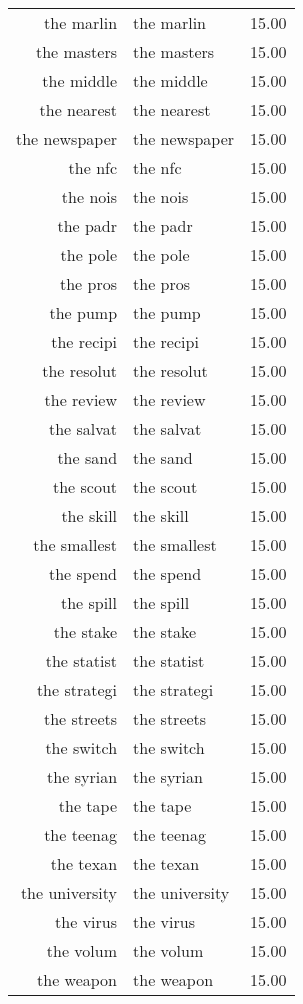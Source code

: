 \begin{table}[ht]
\begin{tabular}{rlr}
  the marlin & the marlin & 15.00 \\ 
  the masters & the masters & 15.00 \\ 
  the middle & the middle & 15.00 \\ 
  the nearest & the nearest & 15.00 \\ 
  the newspaper & the newspaper & 15.00 \\ 
  the nfc & the nfc & 15.00 \\ 
  the nois & the nois & 15.00 \\ 
  the padr & the padr & 15.00 \\ 
  the pole & the pole & 15.00 \\ 
  the pros & the pros & 15.00 \\ 
  the pump & the pump & 15.00 \\ 
  the recipi & the recipi & 15.00 \\ 
  the resolut & the resolut & 15.00 \\ 
  the review & the review & 15.00 \\ 
  the salvat & the salvat & 15.00 \\ 
  the sand & the sand & 15.00 \\ 
  the scout & the scout & 15.00 \\ 
  the skill & the skill & 15.00 \\ 
  the smallest & the smallest & 15.00 \\ 
  the spend & the spend & 15.00 \\ 
  the spill & the spill & 15.00 \\ 
  the stake & the stake & 15.00 \\ 
  the statist & the statist & 15.00 \\ 
  the strategi & the strategi & 15.00 \\ 
  the streets & the streets & 15.00 \\ 
  the switch & the switch & 15.00 \\ 
  the syrian & the syrian & 15.00 \\ 
  the tape & the tape & 15.00 \\ 
  the teenag & the teenag & 15.00 \\ 
  the texan & the texan & 15.00 \\ 
  the university & the university & 15.00 \\ 
  the virus & the virus & 15.00 \\ 
  the volum & the volum & 15.00 \\ 
  the weapon & the weapon & 15.00 \\ 

\end{tabular}
\end{table}
